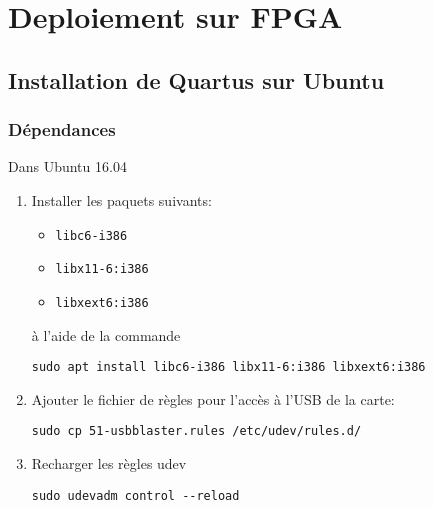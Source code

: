 \section{Deploiement sur FPGA}
\subsection{Installation de Quartus sur Ubuntu}
\subsubsection{Dépendances}
\noindent Dans Ubuntu 16.04
\vspace{0.2em}
\begin{enumerate}
	\item Installer les paquets suivants:
	\begin{itemize}
		\item \texttt{libc6-i386}
		\item \texttt{libx11-6:i386}
		\item \texttt{libxext6:i386}
	\end{itemize}
	à l'aide de la commande
	\begin{lstlisting}
sudo apt install libc6-i386 libx11-6:i386 libxext6:i386
	\end{lstlisting}

	\item Ajouter le fichier de règles pour l'accès à l'USB de la carte:
	\begin{lstlisting}
sudo cp 51-usbblaster.rules /etc/udev/rules.d/
	\end{lstlisting}
	\item Recharger les règles udev
	\begin{lstlisting}
sudo udevadm control --reload
	\end{lstlisting}
\end{enumerate}

